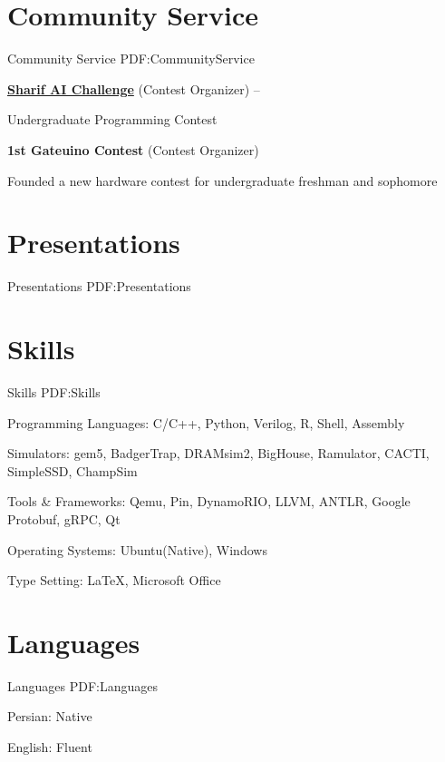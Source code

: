 \documentclass[a4paper,9pt,oneside]{article}
\begin{document}
\begin{body}

\section
{Community Service}
{Community Service}
{PDF:CommunityService}

\BulletItem
\href{https://github.com/SharifAIChallenge}{
\textbf{Sharif AI Challenge}} (Contest Organizer)
\hfill
{} --

\SubBulletItem
Undergraduate Programming Contest

\BulletItem
\textbf{1st Gateuino Contest} (Contest Organizer)
\hfill
{}

\SubBulletItem
Founded a new hardware contest for undergraduate freshman and sophomore

\section
{Presentations}
{Presentations}
{PDF:Presentations}



\section
{Skills}
{Skills}
{PDF:Skills}

\BulletItem
Programming Languages:
C/C++,
Python,
Verilog,
R,
Shell,
Assembly

\BulletItem
Simulators:
gem5,
BadgerTrap,
DRAMsim2,
BigHouse,
Ramulator,
CACTI,
SimpleSSD,
ChampSim

\BulletItem
Tools \& Frameworks:
Qemu,
Pin,
DynamoRIO,
LLVM,
ANTLR,
Google Protobuf,
gRPC,
Qt

\BulletItem
Operating Systems:
Ubuntu(Native),
Windows

\BulletItem
Type Setting:
{\LaTeX},
Microsoft Office



\section
{Languages}
{Languages}
{PDF:Languages}

\BulletItem
Persian: Native

\GapNoBreak
\BulletItem
English: Fluent



\end{body}

\end{document}

